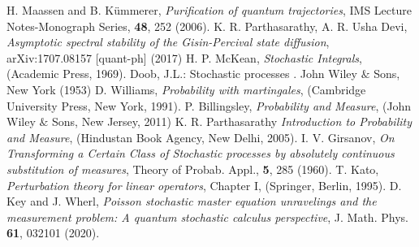 \begin{thebibliography}{99}
	 H. Maassen and B. K{\"u}mmerer, {\em Purification of quantum trajectories}, IMS Lecture Notes-Monograph Series, {\bf 48}, 252 (2006). 
	 K. R. Parthasarathy, A. R.  Usha Devi, {\em Asymptotic spectral stability of the Gisin-Percival state diffusion},  arXiv:1707.08157 [quant-ph] (2017)
	 H. P. McKean, {\em Stochastic Integrals}, (Academic Press, 1969).
	 Doob, J.L.:  Stochastic processes . John Wiley $\&$ Sons, New York (1953)
	  D. Williams,  {\em Probability with martingales},  (Cambridge University Press, New York, 1991). 
	 P. Billingsley, {\em  Probability and Measure}, (John Wiley $\&$ Sons, New Jersey, 2011) 
	 K. R. Parthasarathy {\em  Introduction to Probability and Measure}, (Hindustan Book Agency, New Delhi, 2005).  
	 I. V. Girsanov, {\em On Transforming a Certain Class of Stochastic processes by absolutely continuous substitution of measures}, Theory of Probab. Appl., {\bf 5}, 285 (1960). 
	  T. Kato, {\em  Perturbation theory for linear operators}, Chapter I,  (Springer, Berlin, 1995).
	 D. Key and J. Wherl, {\em Poisson stochastic master equation unravelings and the measurement problem: A quantum stochastic calculus perspective}, J. Math. Phys. {\bf 61}, 032101 (2020). 
\end{thebibliography}
